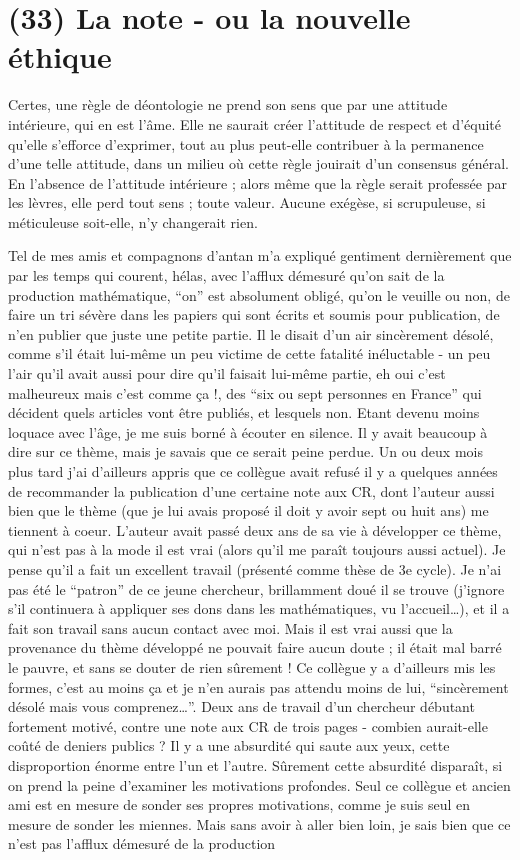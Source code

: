\section{(33) La note - ou la nouvelle éthique}

Certes, une règle de déontologie ne prend son sens que par une attitude intérieure, qui en est l'âme. Elle ne saurait créer l'attitude de respect et d'équité qu'elle s'efforce d'exprimer, tout au plus peut-elle contribuer à la permanence d'une telle attitude, dans un milieu où cette règle jouirait d'un consensus général. En l'absence de l'attitude intérieure ; alors même que la règle serait professée par les lèvres, elle perd tout sens ; toute valeur. Aucune exégèse, si scrupuleuse, si méticuleuse soit-elle, n'y changerait rien.

Tel de mes amis et compagnons d'antan m'a expliqué gentiment dernièrement que par les temps qui courent, hélas, avec l'afflux démesuré qu'on sait de la production mathématique, ``on'' est absolument obligé, qu'on le veuille ou non, de faire un tri sévère dans les papiers qui sont écrits et soumis pour publication, de n'en publier que juste une petite partie. Il le disait d'un air sincèrement désolé, comme s'il était lui-même un peu victime de cette fatalité inéluctable - un peu l'air qu'il avait aussi pour dire qu'il faisait lui-même partie, eh oui c'est malheureux mais c'est comme ça !, des ``six ou sept personnes en France'' qui décident quels articles vont être publiés, et lesquels non. Etant devenu moins loquace avec l'âge, je me suis borné à écouter en silence. Il y avait beaucoup à dire sur ce thème, mais je savais que ce serait peine perdue. Un ou deux mois plus tard j'ai d'ailleurs appris que ce collègue avait refusé il y a quelques années de recommander la publication d'une certaine note aux CR, dont l'auteur aussi bien que le thème (que je lui avais proposé il doit y avoir sept ou huit ans) me tiennent à coeur. L'auteur avait passé deux ans de sa vie à développer ce thème, qui n'est pas à la mode il est vrai (alors qu'il me paraît toujours aussi actuel). Je pense qu'il a fait un excellent travail (présenté comme thèse de 3e cycle). Je n'ai pas été le ``patron'' de ce jeune chercheur, brillamment doué il se trouve (j'ignore s'il continuera à appliquer ses dons dans les mathématiques, vu l'accueil\ldots), et il a fait son travail sans aucun contact avec moi. Mais il est vrai aussi que la provenance du thème développé ne pouvait faire aucun doute ; il était mal barré le pauvre, et sans se douter de rien sûrement ! Ce collègue y a d'ailleurs mis les formes, c'est au moins ça et je n'en aurais pas attendu moins de lui, ``sincèrement désolé mais vous comprenez\ldots''. Deux ans de travail d'un chercheur débutant fortement motivé, contre une note aux CR de trois pages - combien aurait-elle coûté de deniers publics ? Il y a une absurdité qui saute aux yeux, cette disproportion énorme entre l'un et l'autre. Sûrement cette absurdité disparaît, si on prend la peine d'examiner les motivations profondes. Seul ce collègue et ancien ami est en mesure de sonder ses propres motivations, comme je suis seul en mesure de sonder les miennes. Mais sans avoir à aller bien loin, je sais bien que ce n'est pas l'afflux démesuré de la production 